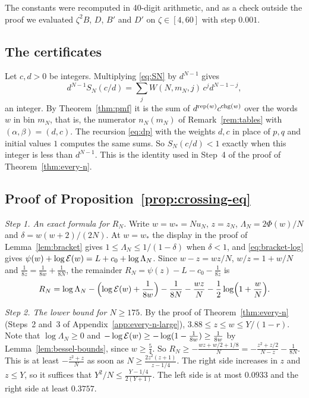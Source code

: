 The constants were recomputed in 40-digit arithmetic, and as a check outside
the proof we evaluated $\zeta^2B$, $D$, $B'$ and $D'$ on
$\zeta\in[4,60]$ with step $0.001$.

\subsection{The certificates}\label{app:certificates}

Let $c,d>0$ be integers. Multiplying \eqref{eq:SN} by $d^{N-1}$ gives
\[
d^{N-1}S_N(c/d)=\sum_jW(N,m_N,j)\,c^jd^{N-1-j},
\]
an integer. By Theorem~\ref{thm:pmf} it is the sum of
$d^{\operatorname{rep}(w)}c^{\operatorname{chg}(w)}$ over the words $w$ in bin $m_N$, that is, the
numerator $n_N(m_N)$ of Remark~\ref{rem:tables} with $(\alpha,\beta)=(d,c)$.
The recursion \eqref{eq:dp} with the weights $d,c$ in place of $p,q$ and
initial values $1$ computes the same sums. So $S_N(c/d)<1$ exactly when this
integer is less than $d^{N-1}$. This is the identity used in Step~4 of the
proof of Theorem~\ref{thm:every-n}.

\subsection{Proof of Proposition~\ref{prop:crossing-eq}}\label{app:crossing-eq}

\emph{Step 1. An exact formula for $R_N$.} Write $w=w_*=Nu_N$, $z=z_N$,
$\Lambda_N=2\Phi(w)/N$ and $\delta=w(w+2)/(2N)$. At $w=w_*$ the display in the
proof of Lemma~\ref{lem:bracket} gives $1\le\Lambda_N\le1/(1-\delta)$ when
$\delta<1$, and \eqref{eq:bracket-log} gives
$\psi(w)+\log \mathcal E(w)=L+c_0+\log\Lambda_N$. Since $w-z=wz/N$, $w/z=1+w/N$ and
$\frac1{8z}=\frac1{8w}+\frac1{8N}$, the remainder
$R_N=\psi(z)-L-c_0-\frac1{8z}$ is
\begin{equation}\label{eq:RN-formula}
R_N=\log\Lambda_N-\Bigl(\log \mathcal E(w)+\frac1{8w}\Bigr)-\frac1{8N}-\frac{wz}N-\frac12\log\Bigl(1+\frac wN\Bigr).
\end{equation}

\emph{Step 2. The lower bound for $N\ge175$.} By the proof of
Theorem~\ref{thm:every-n} (Steps~2 and~3 of Appendix~\ref{app:every-n-large}),
$3.88\le z\le w\le Y/(1-r)$. Note that
$\log\Lambda_N\ge0$ and $-\log \mathcal E(w)\ge-\log(1-\frac1{8w})\ge\frac1{8w}$ by
Lemma~\ref{lem:bessel-bounds}, since $w\ge\frac54$. So
$R_N\ge-\frac{wz+w/2+1/8}N=-\frac{z^2+z/2}{N-z}-\frac1{8N}$. This is at least
$-\frac{z^2+z}N$ as soon as $N\ge\frac{2z^2(z+1)}{z-1/4}$. The right side
increases in $z$ and $z\le Y$, so it suffices that
$Y^2/N\le\frac{Y-1/4}{2(Y+1)}$. The left side is at most $0.0933$ and the
right side at least $0.3757$.

